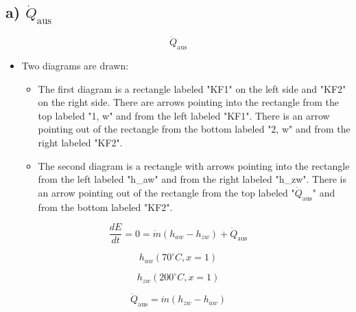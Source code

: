 \subsection*{a) $\dot{Q}_{\text{aus}}$}

\begin{equation*}
\dot{Q}_{\text{aus}}
\end{equation*}

\begin{itemize}
    \item Two diagrams are drawn:
    \begin{itemize}
        \item The first diagram is a rectangle labeled "KF1" on the left side and "KF2" on the right side. There are arrows pointing into the rectangle from the top labeled "1, w" and from the left labeled "KF1". There is an arrow pointing out of the rectangle from the bottom labeled "2, w" and from the right labeled "KF2".
        \item The second diagram is a rectangle with arrows pointing into the rectangle from the left labeled "h_{aw}" and from the right labeled "h_{zw}". There is an arrow pointing out of the rectangle from the top labeled "$\dot{Q}_{\text{aus}}$" and from the bottom labeled "KF2".
    \end{itemize}
\end{itemize}

\begin{equation*}
\frac{dE}{dt} = 0 = \dot{m} (h_{aw} - h_{zw}) + \dot{Q}_{\text{aus}}
\end{equation*}

\begin{equation*}
h_{aw} (70^\circ C, x = 1)
\end{equation*}

\begin{equation*}
h_{zw} (200^\circ C, x = 1)
\end{equation*}

\begin{equation*}
\dot{Q}_{\text{aus}} = \dot{m} (h_{zw} - h_{aw})
\end{equation*}